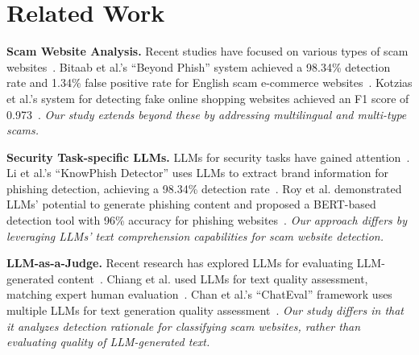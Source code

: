\section{Related Work}
\noindent\textbf{Scam Website Analysis.}
Recent studies have focused on various types of scam websites~\cite{DBLP:conf/ndss/MiramirkhaniSN17,DBLP:conf/ndss/LiYN23,DBLP:conf/www/SrinivasanKMANA18}.
Bitaab et al.'s ``Beyond Phish'' system achieved a 98.34\% detection rate and 1.34\% false positive rate for English scam e-commerce websites~\cite{DBLP:conf/sp/BitaabCOLWAWBSD23}.
Kotzias et al.'s system for detecting fake online shopping websites achieved an F1 score of 0.973~\cite{DBLP:conf/acsac/KotziasRPSB23}.
\textit{Our study extends beyond these by addressing multilingual and multi-type scams.}

\noindent\textbf{Security Task-specific LLMs.}
LLMs for security tasks have gained attention~\cite{alfasi2024unveiling,DBLP:journals/access/KoideNC24}.
Li et al.'s ``KnowPhish Detector'' uses LLMs to extract brand information for phishing detection, achieving a 98.34\% detection rate~\cite{DBLP:conf/uss/LiHDLCOLH24}.
Roy et al. demonstrated LLMs' potential to generate phishing content and proposed a BERT-based detection tool with 96\% accuracy for phishing websites~\cite{DBLP:journals/corr/abs-2310-19181}.
\textit{Our approach differs by leveraging LLMs' text comprehension capabilities for scam website detection.}

\noindent\textbf{LLM-as-a-Judge.}
Recent research has explored LLMs for evaluating LLM-generated content~\cite{DBLP:conf/nips/ZhengC00WZL0LXZ23,DBLP:conf/emnlp/SottanaLZY23}.
Chiang et al. used LLMs for text quality assessment, matching expert human evaluation~\cite{DBLP:conf/acl/ChiangL23}.
Chan et al.'s ``ChatEval'' framework uses multiple LLMs for text generation quality assessment~\cite{DBLP:journals/corr/abs-2308-07201}.
\textit{Our study differs in that it analyzes detection rationale for classifying scam websites, rather than evaluating quality of LLM-generated text.}
